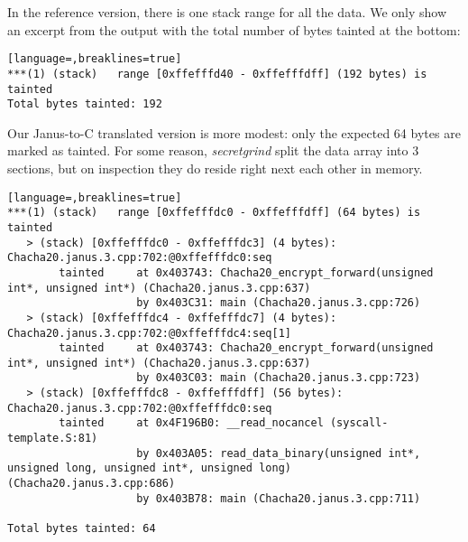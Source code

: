 \documentclass[a4paper,10pt,openright]{memoir}
\newcommand{\term}[1]{\textit{#1}}
\begin{document}

In the reference version, there is one stack range for all the data. We 
only show an excerpt from the output with the total number of bytes 
tainted at the bottom:

\begin{lstlisting}[language=,breaklines=true]
***(1) (stack)	 range [0xffefffd40 - 0xffefffdff] (192 bytes) is tainted
Total bytes tainted: 192
\end{lstlisting}

Our Janus-to-C translated version is more modest: only the expected 64 
bytes are marked as tainted. For some reason, \term{secretgrind} split 
the data array into 3 sections, but on inspection they do reside right 
next each other in memory.

\begin{lstlisting}[language=,breaklines=true]
***(1) (stack)	 range [0xffefffdc0 - 0xffefffdff] (64 bytes) is tainted
   > (stack) [0xffefffdc0 - 0xffefffdc3] (4 bytes): Chacha20.janus.3.cpp:702:@0xffefffdc0:seq
        tainted     at 0x403743: Chacha20_encrypt_forward(unsigned int*, unsigned int*) (Chacha20.janus.3.cpp:637)
                    by 0x403C31: main (Chacha20.janus.3.cpp:726)
   > (stack) [0xffefffdc4 - 0xffefffdc7] (4 bytes): Chacha20.janus.3.cpp:702:@0xffefffdc4:seq[1]
        tainted     at 0x403743: Chacha20_encrypt_forward(unsigned int*, unsigned int*) (Chacha20.janus.3.cpp:637)
                    by 0x403C03: main (Chacha20.janus.3.cpp:723)
   > (stack) [0xffefffdc8 - 0xffefffdff] (56 bytes): Chacha20.janus.3.cpp:702:@0xffefffdc0:seq
        tainted     at 0x4F196B0: __read_nocancel (syscall-template.S:81)
                    by 0x403A05: read_data_binary(unsigned int*, unsigned long, unsigned int*, unsigned long) (Chacha20.janus.3.cpp:686)
                    by 0x403B78: main (Chacha20.janus.3.cpp:711)

Total bytes tainted: 64
\end{lstlisting}
\end{document}
